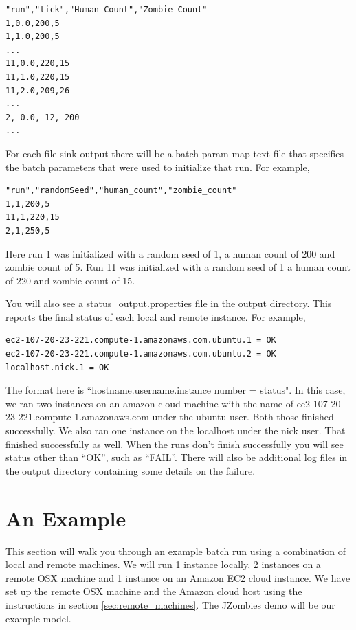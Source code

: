 \documentclass[11pt]{amsart}
\begin{document}
\begin{verbatim}
"run","tick","Human Count","Zombie Count"
1,0.0,200,5
1,1.0,200,5
...
11,0.0,220,15
11,1.0,220,15
11,2.0,209,26
...
2, 0.0, 12, 200
...
\end{verbatim}

For each file sink output there will be a batch param map text file that specifies the batch parameters that were used to initialize that run. For example,

\begin{verbatim}
"run","randomSeed","human_count","zombie_count"
1,1,200,5
11,1,220,15
2,1,250,5
\end{verbatim}

Here run 1 was initialized with a random seed of 1, a human count of 200 and zombie count of 5. Run 11 was initialized with a random seed of 1 a human count of 220 and zombie count of 15.

You will also see a status\_output.properties file in the output directory. This reports the final status of each local and remote instance. For example,

\begin{verbatim}
ec2-107-20-23-221.compute-1.amazonaws.com.ubuntu.1 = OK
ec2-107-20-23-221.compute-1.amazonaws.com.ubuntu.2 = OK
localhost.nick.1 = OK
\end{verbatim}
\noindent
The format here is ``hostname.username.instance number = status".  In this case, we ran two instances on an amazon cloud machine with the name of ec2-107-20-23-221.compute-1.amazonaws.com under the ubuntu user. Both those finished successfully. We also ran one instance on the localhost under the nick user. That finished successfully as well. When the runs don't finish successfully you will see status other than ``OK'', such as ``FAIL''. There will also be additional log files in the output directory containing some details on the failure.


\section{An Example}
This section will walk you through an example batch run using a combination of local and remote machines. We will run 1 instance locally, 2 instances on a remote OSX machine and 1 instance on an Amazon EC2 cloud instance. We have set up the remote OSX machine and the Amazon cloud host using the instructions in section \ref{sec:remote_machines}. The JZombies demo will be our example model.
\end{document}
